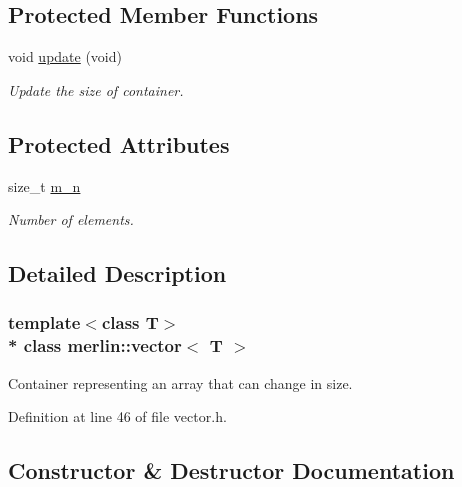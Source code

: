 \subsection*{Protected Member Functions}
\begin{DoxyCompactItemize}
\item 
void \hyperlink{classmerlin_1_1vector_aa028c7af6c1149967f36241fa8b17d6c}{update} (void)\hypertarget{classmerlin_1_1vector_aa028c7af6c1149967f36241fa8b17d6c}{}\label{classmerlin_1_1vector_aa028c7af6c1149967f36241fa8b17d6c}

\begin{DoxyCompactList}\small\item\em Update the size of container. \end{DoxyCompactList}\end{DoxyCompactItemize}
\subsection*{Protected Attributes}
\begin{DoxyCompactItemize}
\item 
size\+\_\+t \hyperlink{classmerlin_1_1vector_a1e8ed92fa4fd93cd512e6ef59fbbf704}{m\+\_\+n}\hypertarget{classmerlin_1_1vector_a1e8ed92fa4fd93cd512e6ef59fbbf704}{}\label{classmerlin_1_1vector_a1e8ed92fa4fd93cd512e6ef59fbbf704}

\begin{DoxyCompactList}\small\item\em Number of elements. \end{DoxyCompactList}\end{DoxyCompactItemize}


\subsection{Detailed Description}
\subsubsection*{template$<$class T$>$\\*
class merlin\+::vector$<$ T $>$}

Container representing an array that can change in size. 

Definition at line 46 of file vector.\+h.



\subsection{Constructor \& Destructor Documentation}
